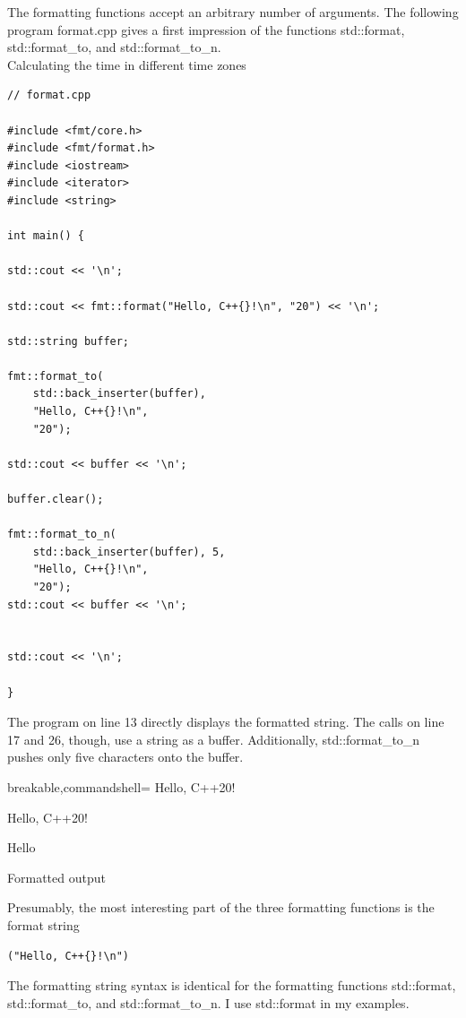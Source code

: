 The formatting functions accept an arbitrary number of arguments. The following program format.cpp gives a first impression of the functions std::format, std::format\_to, and std::format\_to\_n.
\
\hspace*{\fill} \\ %
\noindent
Calculating the time in different time zones
\begin{lstlisting}[style=styleCXX]
// format.cpp

#include <fmt/core.h>
#include <fmt/format.h>
#include <iostream>
#include <iterator>
#include <string>

int main() {

std::cout << '\n';

std::cout << fmt::format("Hello, C++{}!\n", "20") << '\n';

std::string buffer;

fmt::format_to(
	std::back_inserter(buffer),
	"Hello, C++{}!\n",
	"20");

std::cout << buffer << '\n';

buffer.clear();

fmt::format_to_n(
	std::back_inserter(buffer), 5,
	"Hello, C++{}!\n",
	"20");
std::cout << buffer << '\n';


std::cout << '\n';

}
\end{lstlisting}

The program on line 13 directly displays the formatted string. The calls on line 17 and 26, though, use a string as a buffer. Additionally, std::format\_to\_n pushes only five characters onto the buffer.

\begin{tcblisting}{breakable,commandshell={}}
Hello, C++20!

Hello, C++20!

Hello
\end{tcblisting}

\begin{center}
Formatted output
\end{center}

Presumably, the most interesting part of the three formatting functions is the format string \begin{lstlisting}[style=styleCXX]
("Hello, C++{}!\n")
\end{lstlisting}


The formatting string syntax is identical for the formatting functions std::format, std::format\_to, and std::format\_to\_n. I use std::format in my examples.

